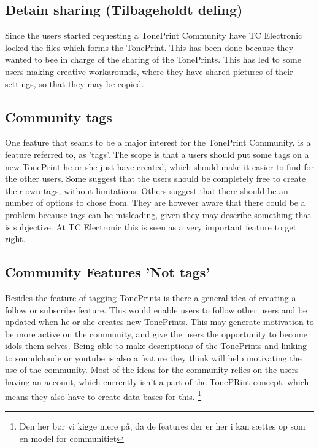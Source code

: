 \subsection*{Detain sharing (Tilbageholdt deling)} 
\label{ThemeDetainSharing}
Since the users started requesting a TonePrint Community have TC Electronic locked the files which forms the TonePrint. This has been done because they wanted to bee in charge of the sharing of the TonePrints. This has led to some users making creative workarounds, where they have shared pictures of their settings, so that they may be copied.

\subsection*{Community tags} 
\label{ThemeCommunityTags}
One feature that seams to be a major interest for the TonePrint Community, is a feature referred to, as 'tags'. The scope is that a users should put some tags on a new TonePrint he or she just have created, which should make it easier to find for the other users. Some suggest that the users should be completely free to create their own tags, without limitations. Others suggest that there should be an number of options to chose from. They are however aware that there could be a problem because tags can be misleading, given they may describe something that is subjective. At TC Electronic this is seen as a very important feature to get right.

\subsection{Community Features 'Not tags'}
\label{ThemeCommuninityFeaturesNotTags}
Besides the feature of tagging TonePrints is there a general idea of creating a follow or subscribe feature. This would enable users to follow other users and be updated when he or she creates new TonePrints. This may generate motivation to be more active on the community, and give the users the opportunity to become idols them selves. Being able to make descriptions of the TonePrints and linking to soundcloude or youtube is also a feature they think will help motivating the use of the community. Most of the ideas for the community relies on the users having an account, which currently isn't a part of the TonePRint concept, which means they also have to create data bases for this. \footnote{Den her bør vi kigge mere på, da de features der er her i kan sættes op som en model for communitiet}


